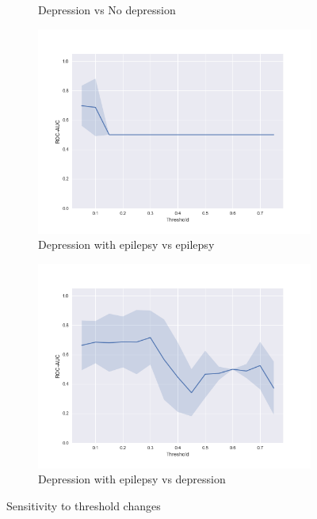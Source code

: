 \documentclass[12pt]{extarticle}
\theoremstyle{definition}
\theoremstyle{remark}
\begin{document}
\begin{figure}[H]
\begin{subfigure}[b]{0.48\textwidth}
			\caption{Depression vs No depression}
		\end{subfigure}%
		\hfill
		\begin{subfigure}[b]{0.48\textwidth}
			\centering
			\includegraphics[width=\linewidth]{pic/DE_E_th.png}
			\caption{Depression with epilepsy vs epilepsy}
		\end{subfigure}%
		\begin{subfigure}[b]{0.48\textwidth}
			\centering
			\includegraphics[width=\linewidth]{pic/DE_D_th.png}
			\caption{Depression with epilepsy vs depression}
		\end{subfigure}
		\caption{Sensitivity to threshold changes}
		\label{fig:thr}
	\end{figure}
	
\end{document}
